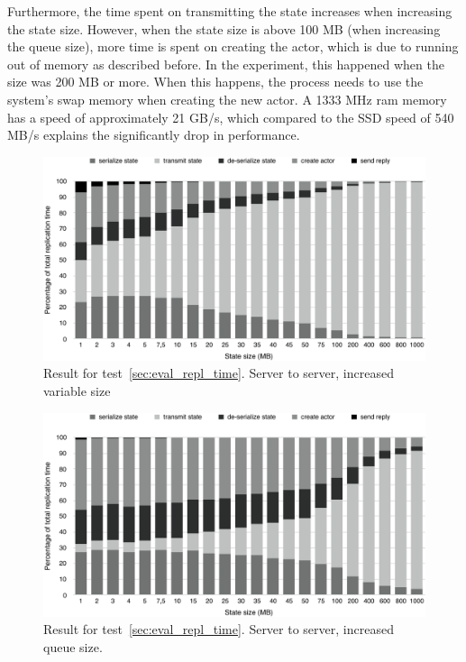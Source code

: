 \documentclass{cslthse-msc}
\begin{document}
 Furthermore, the time spent on transmitting the state increases when increasing the state size. However, when the state size is above 100 MB (when increasing the queue size), more time is spent on creating the actor, which is due to running out of memory as described before. In the experiment, this happened when the size was 200 MB or more. When this happens, the process needs to use the system's swap memory when creating the new actor. A 1333 MHz ram memory has a speed of approximately 21 GB/s, which compared to the SSD speed of 540 MB/s explains the significantly drop in performance.

\begin{figure}[hbt!]
\centering
\includegraphics[scale=0.5]{images/results/replication_time/server_parts_variable.pdf} 
\caption{Result for test~\ref{sec:eval_repl_time}. Server to server, increased variable size} \label{fig:replication_time_parts_server_variable}
\end{figure}

\begin{figure}[hbt!]
\centering
\includegraphics[scale=0.5]{images/results/replication_time/server_parts_queue.pdf} 
\caption{Result for test~\ref{sec:eval_repl_time}. Server to server, increased queue size.} \label{fig:replication_time_parts_server_queue}
\end{figure}
\end{document}
